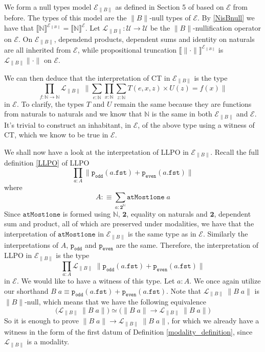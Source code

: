 \documentclass[12pt]{report}
\begin{document}
We form a null types model $\mathcal{E}_{\lVert B \rVert}$ as defined in Section 5 of \cite{1905.03014} based on $\mathcal{E}$ from before. 
The types of this model are the $\lVert B \rVert $-null types of $\mathcal{E}$. 
By \cref{NisBnull} we have that $\llbracket \mathbb{N} \rrbracket^{\mathcal{E}_{\lVert B \rVert}} = \llbracket \mathbb{N} \rrbracket^\mathcal{E}$. 
Let $\mathcal{L}_{\lVert B \rVert} : \mathcal{U} \rightarrow \mathcal{U}$ be the $\lVert B \rVert$-nullification operator on $\mathcal{E}$. 
On $\mathcal{E}_{\lVert B \rVert}$, dependend products, dependent sums and identity on naturals are all inherited from $\mathcal{E}$, while propositional truncation $\llbracket \lVert \cdot \rVert \rrbracket^{\mathcal{E}_{\lVert B \rVert}}$ is $\mathcal{L}_{\lVert B \rVert} \lVert\cdot \rVert $ on $\mathcal{E}$.

We can then deduce that the interpretation of CT in $\mathcal{E}_{\lVert B \rVert}$ is the type 
$$\prod_{f : \mathbb{N}\rightarrow \mathbb{N}} \mathcal{L}_{\lVert B \rVert}\;\Big\lVert \sum_{e : \mathbb{N}} \prod_{x : \mathbb{N}} \sum_{z : \mathbb{N}} T(e,x,z) \times U(z) = f(x) \Big\rVert$$
in $\mathcal{E}$. To clarify, the types $T$ and $U$ remain the same because they are functions from naturals to naturals and we know that $\mathbb{N}$ is the same in both $\mathcal{E}_{\lVert B \rVert}$ and $\mathcal{E}$. 
It's trivial to construct an inhabitant, in $\mathcal{E}$, of the above type using a witness of CT, which we know to be true in $\mathcal{E}$. 

We shall now have a look at the interpretation of LLPO in $\mathcal{E}_{\lVert B \rVert}$. 
Recall the full definition \ref{LLPO} of LLPO
$$\prod_{a : A}\lVert \mathtt{p_{odd}}(a.\mathtt{fst}) + \mathtt{p_{even}}(a.\mathtt{fst}) \rVert$$
where $$A :\equiv \sum_{a: \mathbf{2}^\mathbb{N}}\mathtt{atMost1one}\;a$$
Since $\mathtt{atMost1one}$ is formed using $\mathbb{N}$, $\mathbf{2}$, equality on naturals and $\mathbf{2}$, dependent sum and product, all of which are preserved under modalities, we have that the interpretation of $\mathtt{atMost1one}$ in $\mathcal{E}_{\lVert B \rVert}$ is the same type as in $\mathcal{E}$. 
Similarly the interpretations of $A$, $\mathtt{p_{odd}}$ and $\mathtt{p_{even}}$ are the same. 
Therefore, the interpretation of LLPO in $\mathcal{E}_{\lVert B \rVert}$ is the type 
$$\prod_{a : A}\mathcal{L}_{\lVert B \rVert}\;\lVert \mathtt{p_{odd}}(a.\mathtt{fst}) + \mathtt{p_{even}}(a.\mathtt{fst}) \rVert$$
in $\mathcal{E}$. 
We would like to have a witness of this type. 
Let $a : A$. 
We once again utilize our shorthand $B\; a \equiv \mathtt{p_{odd}}(a.\mathtt{fst}) + \mathtt{p_{even}}(a.\mathtt{fst})$. 
Note that $\mathcal{L}_{\lVert B \rVert}\;\lVert B\; a \rVert$ is $\lVert B \rVert$-null, which means that we have the following equivalence
$$\big(\mathcal{L}_{\lVert B \rVert}\; \lVert B\;a\rVert\big) \simeq \big(\lVert B\; a \rVert \rightarrow \mathcal{L}_{\lVert B \rVert}\;\lVert B\; a \rVert\big)$$
So it is enough to prove $\lVert B\; a \rVert \rightarrow \mathcal{L}_{\lVert B \rVert}\;\lVert B\; a \rVert$, for which we already have a witness in the form of the first datum of Definition \ref{modality_definition}, since $\mathcal{L}_{\lVert B \rVert}$ is a modality. 
\end{document}

